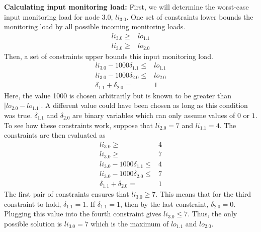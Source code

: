 {\bf Calculating input monitoring load:}
First, we will determine the worst-case input monitoring load for node 3.0,
$li_{3.0}$.  One set of constraints lower bounds the monitoring load by all
possible incoming monitoring loads.
\begin{align*}
  li_{3.0} \geq& lo_{1.1} \\
  li_{3.0} \geq& lo_{2.0} 
\end{align*}
Then, a set of constraints upper bounds this input monitoring load.
\begin{align*}
  li_{3.0} - 1000 \delta_{1.1} \leq& lo_{1.1} \\
  li_{3.0} - 1000 \delta_{2.0} \leq& lo_{2.0} \\
  \delta_{1.1} + \delta_{2.0} =& 1
\end{align*}
Here, the value 1000 is chosen arbitrarily but is known to be greater than
$|lo_{2.0} - lo_{1.1}|$.  A different value could have been chosen as long as
this condition was true.  $\delta_{1.1}$ and $\delta_{2.0}$ are binary
variables which can only assume values of $0$ or $1$.  To see how these
constraints work, suppose that $li_{2.0} = 7$ and $li_{1.1} = 4$. The
constraints are then evaluated as
\begin{align*}
  li_{3.0} \geq& 4 \\
  li_{3.0} \geq& 7 \\
  li_{3.0} - 1000 \delta_{1.1} \leq& 4 \\
  li_{3.0} - 1000 \delta_{2.0} \leq& 7 \\
  \delta_{1.1} + \delta_{2.0} =& 1
\end{align*}
The first pair of constraints ensures that $li_{3.0} \geq 7$. This means that
for the third constraint to hold, $\delta_{1.1} = 1$. If $\delta_{1.1} = 1$,
then by the last constraint, $\delta_{2.0} = 0$. Plugging this value into the
fourth constraint gives $li_{3.0} \leq 7$. Thus, the only possible solution is
$li_{3.0} = 7$ which is the maximum of $lo_{1.1}$ and $lo_{2.0}$.

